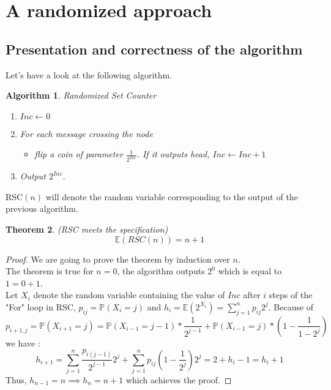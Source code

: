 \documentclass{article}
\theoremstyle{plain}
\theoremstyle{plain}
\newtheorem{thm}{Theorem}
\theoremstyle{plain}
\newtheorem{algo}[thm]{Algorithm}
\theoremstyle{plain}
\begin{document}
\section{A randomized approach}

\subsection{Presentation and correctness of the algorithm}
Let's have a look at the following algorithm.
\begin{algo}
\emph{Randomized Set Counter}
\begin{enumerate}
	\item $Inc \leftarrow 0$
	\item For each message crossing the node 
\begin{itemize}
	\item flip a coin of parameter $\frac{1}{2^{Inc}}$. If it outputs head, $Inc \leftarrow Inc + 1$
\end{itemize}
	\item Output $2^{Inc}$.
	\end{enumerate} 
\end{algo}

RSC$\left(n\right)$ will denote the random variable corresponding to the output of the previous algorithm.
\begin{thm} (RSC meets the specification)
\[\mathbb{E}\left(RSC(n)\right) = n+1\]
\end{thm}

\begin{proof}
We are going to prove the theorem by induction over $n$.\\
The theorem is true for $n = 0$, the algorithm outputs $2^0$ which is equal to $1 = 0 + 1$.\\
Let $X_i$ denote the random variable containing the value of $Inc$ after $i$ steps of the "For" loop in RSC, $p_{ij} = \mathbb{P}\left(X_i = j\right)$ and $h_i = \mathbb{E}\left(2^{X_i}\right) = \sum_{j=1}^{n}p_{ij}2^j$. Because of \[p_{i+1,j} = \mathbb{P}\left(X_{i+1} = j\right)=\mathbb{P}\left(X_{i-1} = j-1\right)*\frac{1}{2^{j-1}}+ \mathbb{P}\left(X_{i-1} = j\right)*\left(1-\frac{1}{1-2^j}\right)\] we have : \[h_{i+1} = \sum_{j=1}^{ n}\frac{p_{i(j-1)}}{2^{j-1}}2^j + \sum_{j=1}^{ n}p_{ij}\left(1-\frac{1}{2^j}\right)2^j = 2 + h_i - 1 = h_i + 1\] Thus, $h_{n-1} = n  \implies h_n = n + 1$ which achieves the proof.
\end{proof}
\end{document}
